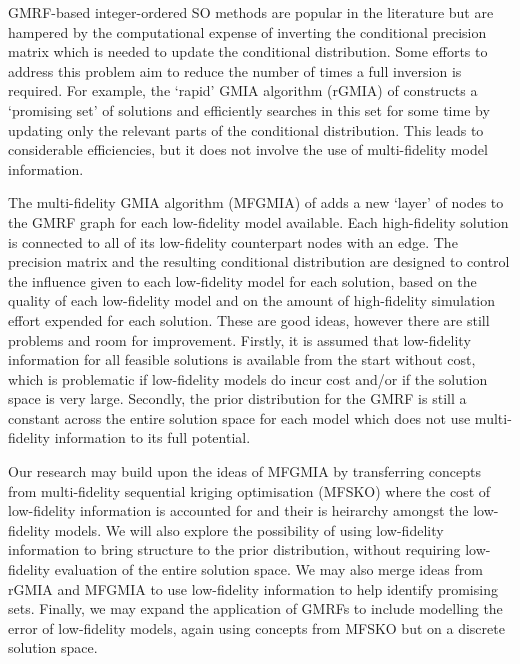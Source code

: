 \documentclass[12pt,a4paper]{article}
\begin{document}
GMRF-based integer-ordered SO methods are popular in the literature but are hampered by the computational expense of inverting the conditional precision matrix which is needed to update the conditional distribution. Some efforts to address this problem aim to reduce the number of times a full inversion is required. For example, the `rapid' GMIA algorithm (rGMIA) of \citep{semelhago2021rapid} constructs a `promising set' of solutions and efficiently searches in this set for some time by updating only the relevant parts of the conditional distribution. This leads to considerable efficiencies, but it does not involve the use of multi-fidelity model information.

The multi-fidelity GMIA algorithm (MFGMIA) of \citep{li2022multi} adds a new `layer' of nodes to the GMRF graph for each low-fidelity model available. Each high-fidelity solution is connected to all of its low-fidelity counterpart nodes with an edge. The precision matrix and the resulting conditional distribution are designed to control the influence given to each low-fidelity model for each solution, based on the quality of each low-fidelity model and on the amount of high-fidelity simulation effort expended for each solution. These are good ideas, however there are still problems and room for improvement. Firstly, it is assumed that low-fidelity information for all feasible solutions is available from the start without cost, which is problematic if low-fidelity models do incur cost and/or if the solution space is very large. Secondly, the prior distribution for the GMRF is still a constant across the entire solution space for each model which does not use multi-fidelity information to its full potential.

Our research may build upon the ideas of MFGMIA by transferring concepts from multi-fidelity sequential kriging optimisation (MFSKO) \citep{huang2006sequential} where the cost of low-fidelity information is accounted for and their is heirarchy amongst the low-fidelity models. We will also explore the possibility of using low-fidelity information to bring structure to the prior distribution, without requiring low-fidelity evaluation of the entire solution space. We may also merge ideas from rGMIA and MFGMIA to use low-fidelity information to help identify promising sets. Finally, we may expand the application of GMRFs to include modelling the error of low-fidelity models, again using concepts from MFSKO but on a discrete solution space. 

\newpage



\end{document}
